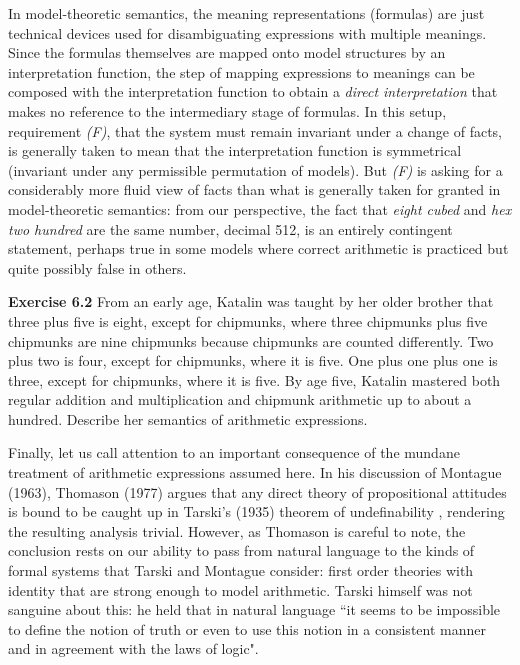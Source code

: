 In model-theoretic semantics, the meaning representations (formulas) are just
technical devices used for disambiguating expressions with multiple meanings.
Since the formulas themselves are mapped onto model structures by an
interpretation function, the step of mapping expressions to meanings can be
composed with the interpretation function to obtain a {\it direct
interpretation} that makes no reference to the intermediary stage of formulas.
In this setup, requirement {\sl (F)}, that the system must remain invariant
under a change of facts, is generally taken to mean that the interpretation
function is symmetrical (invariant under any permissible permutation of
models). But {\sl (F)} is asking for a considerably more fluid view of facts
than what is generally taken for granted in model-theoretic semantics: from
our perspective, the fact that {\it eight cubed} and {\it hex two hundred} are
the same number, decimal 512, is an entirely contingent statement, perhaps
true in some models where correct arithmetic is practiced but quite possibly
false in others. 

\medskip
\noindent
{\bf Exercise 6.2} From an early age, Katalin was taught by her older brother
that three plus five is eight, except for chipmunks, where three chipmunks
plus five chipmunks are nine chipmunks because chipmunks are counted
differently. Two plus two is four, except for chipmunks, where it is five.
One plus one plus one is three, except for chipmunks, where it is five. By age
five, Katalin mastered both regular addition and multiplication and chipmunk
arithmetic up to about a hundred. Describe her semantics of arithmetic
expressions. 

\medskip
\noindent
Finally, let us call attention to an important consequence of the mundane
treatment of arithmetic expressions assumed here. In his discussion of
Montague (1963), \nocite{Montague:1963} \nocite{Thomason:1977} Thomason (1977)
argues that any direct theory of propositional attitudes is bound to be caught
up in Tarski's (1935) theorem of undefinability \cite{Tarski:1956}, rendering
the resulting analysis trivial.  However, as Thomason is careful
to note, the conclusion rests on our ability to pass from natural language to
the kinds of formal systems that Tarski and Montague consider: first order
theories with identity that are strong enough to model arithmetic. Tarski
himself was not sanguine about this: he held that in natural language ``it
seems to be impossible to define the notion of truth or even to use this
notion in a consistent manner and in agreement with the laws of
logic".

